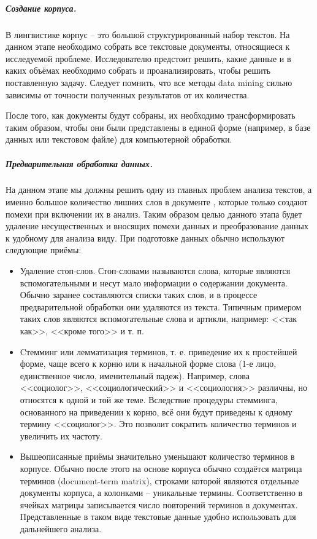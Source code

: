 	\subparagraph{Создание корпуса.} В лингвистике корпус -- это большой структурированный набор текстов. На данном этапе необходимо собрать все текстовые документы, относящиеся к исследуемой проблеме. Исследователю предстоит решить, какие данные и в каких объёмах необходимо собрать и проанализировать, чтобы решить поставленную задачу. Следует помнить, что все методы data mining сильно зависимы от точности полученных результатов от их количества.
	
	После того, как документы будут собраны, их необходимо трансформировать таким образом, чтобы они были представлены в единой форме (например, в базе данных или текстовом файле) для компьютерной обработки.

	\subparagraph{Предварительная обработка данных.} На данном этапе мы должны решить одну из главных проблем анализа текстов, а именно большое количество лишних слов в документе \cite[стр. 213]{bargesyan2009}, которые только создают помехи при включении их в анализ. Таким образом целью данного этапа будет удаление несущественных и вносящих помехи данных и преобразование данных к удобному для анализа виду. При подготовке данных обычно используют следующие приёмы:
	
	\begin{itemize}
	
	\item Удаление стоп-слов. Стоп-словами называются слова, которые являются вспомогательными и несут мало информации о содержании документа. Обычно заранее составляются списки таких слов, и в процессе предварительной обработки они удаляются из текста. Типичным примером таких слов являются вспомогательные слова и артикли, например: <<так как>>, <<кроме того>> и т. п.
	
	\item Cтемминг или лемматизация терминов, т. е. приведение их к простейшей форме, чаще всего к корню или к начальной форме слова (1-е лицо, единственное число, именительный падеж). Например, слова <<социолог>>, <<социологический>> и <<социология>> различны, но относятся к одной и той же теме. Вследствие процедуры стемминга, основанного на приведении к корню, всё они будут приведены к одному термину <<социолог>>. Это позволит сократить количество терминов и увеличить их частоту.
	
	\item Вышеописанные приёмы значительно уменьшают количество терминов в корпусе. Обычно после этого на основе корпуса обычно создаётся матрица терминов (document-term matrix), строками которой являются отдельные документы корпуса, а колонками -- уникальные термины. Соответственно в ячейках матрицы записывается число повторений терминов в документах. Представленные в таком виде текстовые данные удобно использовать для дальнейшего анализа.

	\end{itemize}

